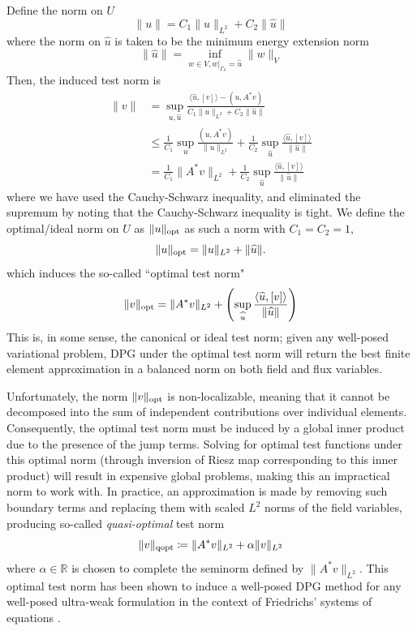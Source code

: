 \documentclass[11pt,onecolumn]{scrartcl}
\begin{document}
Define the norm on $U$
\[
\|u\| = C_1\|u\|_{L^2} + C_2\|\widehat{u}\|
\]
where the norm on $\widehat{u}$ is taken to be the minimum energy extension norm
\[
\|\widehat{u}\| = \inf_{w\in V, \left.w\right|_{\Gamma_h}=\widehat{u}} \|w\|_V
\]
Then, the induced test norm is 
\begin{align*}
\|v\| &= \sup_{u,\widehat{u}} \frac{\langle \widehat{u}, [v] \rangle - (u,A^*v)}{C_1\|u\|_{L^2} + C_2\|\widehat{u}\|} \\
&\leq \frac{1}{C_1}\sup_{u} \frac{(u,A^*v)}{\|u\|_{L^2}} + \frac{1}{C_2}\sup_{\widehat{u}} \frac{\langle \widehat{u}, [v] \rangle}{\|\widehat{u}\|}\\
&= \frac{1}{C_1}\|A^*v\|_{L^2} + \frac{1}{C_2}\sup_{\widehat{u}} \frac{\langle \widehat{u}, [v] \rangle}{\|\widehat{u}\|}
\end{align*}
where we have used the Cauchy-Schwarz inequality, and eliminated the supremum by noting that the Cauchy-Schwarz inequality is tight.  We define the optimal/ideal norm on $U$ as $\|u\|_{\rm opt}$ as such a norm with $C_1=C_2 = 1$,
\[
\|u\|_{\rm opt} = \|u\|_{L^2} + \|\widehat{u}\|.
\]
which induces the so-called ``optimal test norm"
\[
\|v\|_{\rm opt} = \|A^*v\|_{L^2} + \left(\sup_{\widehat{u}} \frac{\langle \widehat{u}, [v] \rangle}{\|\widehat{u}\|}\right)
\]
This is, in some sense, the canonical or ideal test norm; given any well-posed variational problem, DPG under the optimal test norm will return the best finite element approximation in a balanced norm on both field and flux variables. 

Unfortunately, the norm $\|v\|_{\rm opt}$ is non-localizable, meaning that it cannot be decomposed into the sum of independent contributions over individual elements.  Consequently, the optimal test norm must be induced by a global inner product due to the presence of the jump terms.  Solving for optimal test functions under this optimal norm (through inversion of Riesz map corresponding to this inner product) will result in expensive global problems, making this an impractical norm to work with. In practice, an approximation is made by removing such boundary terms and replacing them with scaled $L^2$ norms of the field variables, producing so-called \textit{quasi-optimal} test norm
\[
\|v\|_{\rm qopt} \coloneqq \|A^*v\|_{L^2} + \alpha \|v\|_{L^2}
\]
where $\alpha \in \mathbb{R}$ is chosen to complete the seminorm defined by $\|A^*v\|_{L^2}$.  This optimal test norm has been shown to induce a well-posed DPG method for any well-posed ultra-weak formulation in the context of Friedrichs' systems of equations \cite{DPGFriedrichs}.  
\end{document}
